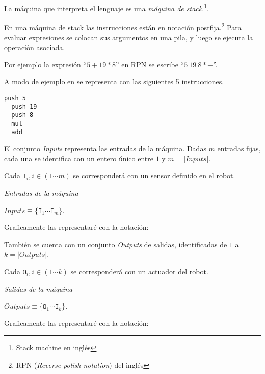 
  La máquina que interpreta el lenguaje \alf{} es una
\textit{máquina de stack}.\footnote{Stack machine en inglés}.

  En una máquina de stack las instrucciones están en notación
postfija.\footnote{RPN (\textit{Reverse polish notation}) del inglés}
  Para evaluar expresiones se colocan sus argumentos en una pila, y luego
se ejecuta la operación asociada.
  
  Por ejemplo la expresión ``$5 + 19 * 8$'' en RPN se
escribe ``$5\ 19\ 8 * +$''.
  
  A modo de ejemplo en \alf{} se representa con las
  siguientes 5 instrucciones.

  \begin{Verbatim}[frame=single]
  push 5
  push 19
  push 8
  mul
  add
  \end{Verbatim}

  El conjunto \textit{Inputs} representa las entradas de la máquina.
  Dadas $m$ entradas fijas, cada una se identifica con un entero único
  entre $1$ y $m = | \textit{Inputs} |$.

  Cada $\texttt{I}_i, i \in (1 \dotsb m)$ se corresponderá con un sensor
  definido en el robot.

\begin{definicion}
  \textit{Entradas de la máquina}\\
  \begin{center}
    $\textit{Inputs} \equiv \{\texttt{I}_1 \dotsb \texttt{I}_m\}$.
  \end{center}
\end{definicion}
  
  Graficamente las representaré con la notación:

  

  También se cuenta con un conjunto \textit{Outputs} de salidas,
  identificadas de $1$ a $k = | \textit{Outputs} |$.
  
  Cada $\texttt{O}_i, i \in (1 \dotsb k)$ se corresponderá con un actuador
  del robot.

\begin{definicion}
  \textit{Salidas de la máquina}\\
  \begin{center}
    $\textit{Outputs} \equiv \{\texttt{O}_1 \dotsb \texttt{I}_k\}$.
  \end{center}
\end{definicion}
  
  Graficamente las representaré con la notación:

